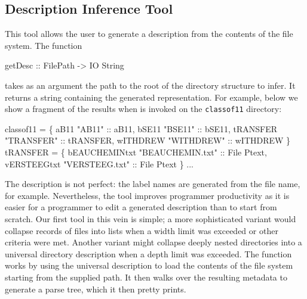 \subsection{Description Inference Tool}
This tool allows the user to generate a \forest{} description from the
contents of the file system.   The function
\begin{code}
getDesc :: FilePath -> IO String
\end{code}
takes as an argument the path to the root of the directory structure
to infer.  It returns a string containing the generated
representation.  For example, below we show a fragment of the
results when
 is invoked on the \texttt{classof11} directory:
\begin{code}
 classof11 =  \{
    aB11  "AB11" :: aB11,
    bSE11  "BSE11" :: bSE11,
    tRANSFER  "TRANSFER" :: tRANSFER,
    wITHDREW  "WITHDREW" :: wITHDREW \}
 tRANSFER =  \{
    bEAUCHEMINtxt  "BEAUCHEMIN.txt" :: File Ptext,
    vERSTEEGtxt  "VERSTEEG.txt" :: File Ptext \}
...
\end{code}
The description is not perfect: the label names are generated 
from the file name, for example.  Nevertheless, the tool improves
programmer productivity as it is
easier for a programmer to edit a generated description than to
start from scratch.   Our first tool in this vein is simple;
a more sophisticated variant would collapse records of files
into lists when a width limit was exceeded or
other criteria were met.  Another variant might
collapse deeply nested directories into a universal directory
description when a depth limit was exceeded.
The  function works by using the universal description to
load the contents of the file system starting from the supplied path.
It then walks over the resulting metadata to generate a \forest{}
parse tree, which it then pretty prints.



